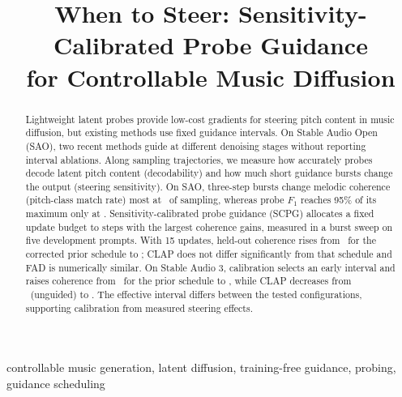 \documentclass{article}
\title{When to Steer: Sensitivity-Calibrated Probe Guidance\\for Controllable Music Diffusion}
\begin{document}
\ninept
\maketitle

\begin{abstract}
Lightweight latent probes provide low-cost gradients for steering pitch content in music diffusion, but existing methods use fixed guidance intervals. On Stable Audio Open (SAO), two recent methods guide at different denoising stages without reporting interval ablations. Along sampling trajectories, we measure how accurately probes decode latent pitch content (decodability) and how much short guidance bursts change the output (steering sensitivity). On SAO, three-step bursts change melodic coherence (pitch-class match rate) most at \peakDC\ of sampling, whereas probe $F_1$ reaches 95\% of its maximum only at \peakF. Sensitivity-calibrated probe guidance (SCPG) allocates a fixed update budget to steps with the largest coherence gains, measured in a burst sweep on five development prompts. With 15 updates, held-out coherence rises from \cohMLSP\ for the corrected prior schedule to \cohTopK; CLAP does not differ significantly from that schedule and FAD is numerically similar. On Stable Audio 3, calibration selects an early interval and raises coherence from \saThreeCohMLSP\ for the prior schedule to \saThreeCohTopK, while CLAP decreases from \saThreeClapSAO\ (unguided) to \saThreeClapTopK. The effective interval differs between the tested configurations, supporting calibration from measured steering effects.
\end{abstract}

\begin{keywords}
controllable music generation, latent diffusion, training-free guidance, probing, guidance scheduling
\end{keywords}
\end{document}
